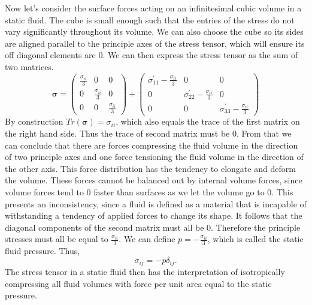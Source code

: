 \documentclass[12pt, letter]{report}
\begin{document}
Now let's consider the surface forces acting on an infinitesimal cubic volume in a static fluid. The cube is small enough such that the entries of the stress do not vary significantly throughout its volume. We can also choose the cube so its sides are aligned parallel to the principle axes of the stress tensor, which will ensure its off diagonal elements are $0$. We can then express the stress tensor as the sum of two matrices.
\begin{equation}
\boldsymbol{\sigma}=
\begin{pmatrix}
\frac{\sigma_{ii}}{3} & 0 & 0 \\
0 & \frac{\sigma_{ii}}{3} & 0 \\
0 & 0 & \frac{\sigma_{ii}}{3}
\end{pmatrix}
+
\begin{pmatrix}
\sigma^{'}_{11}-\frac{\sigma_{ii}}{3} & 0 & 0 \\
0 & \sigma^{'}_{22}-\frac{\sigma_{ii}}{3} & 0 \\
0 & 0 & \sigma^{'}_{33}-\frac{\sigma_{ii}}{3}
\end{pmatrix}
\end{equation}
By construction $Tr(\boldsymbol{\sigma})=\sigma_{ii}$, which also equals the trace of the first matrix on the right hand side. Thus the trace of second matrix must be $0$. From that we can conclude that there are forces compressing the fluid volume in the direction of two principle axes and one force tensioning the fluid volume in the direction of the other axis. This force distribution has the tendency to elongate and deform the volume. These forces cannot be balanced out by internal volume forces, since volume forces tend to $0$ faster than surfaces as we let the volume go to $0$. This presents an inconsistency, since a fluid is defined as a material that is incapable of withstanding a tendency of applied forces to change its shape. It follows that the diagonal components of the second matrix must all be $0$. Therefore the principle stresses must all be equal to $\frac{\sigma_{ii}}{3}$. We can define $p=-\frac{\sigma_{ii}}{3}$, which is called the static fluid pressure. Thus,
\begin{equation}
\sigma_{ij} = -p \delta_{ij}.
\end{equation}
The stress tensor in a static fluid then has the interpretation of isotropically compressing all fluid volumes with force per unit area equal to the static pressure.
\end{document}

